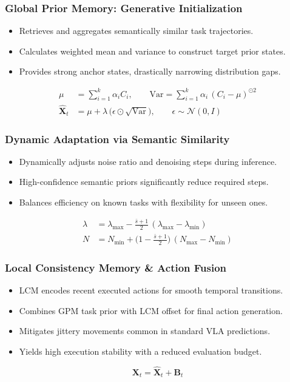 \documentclass{beamer}
\begin{document}
\begin{frame}
\frametitle{Global Prior Memory: Generative Initialization}
\begin{itemize}
\item Retrieves and aggregates semantically similar task trajectories.
\item Calculates weighted mean and variance to construct target prior states.
\item Provides strong anchor states, drastically narrowing distribution gaps.
\end{itemize}
\begin{align*}
\mu &= \sum_{i=1}^{k}\alpha_i C_i,\qquad \mathrm{Var}=\sum_{i=1}^{k}\alpha_i\, (C_i-\mu)^{\odot 2} \\
\mathbf{\hat{X}}_{t} &= \mu+\lambda\,\big(\epsilon\odot\sqrt{\mathrm{Var}}\big), \qquad \epsilon\sim\mathcal{N}(0,I)
\end{align*}
\end{frame}
\begin{frame}
\frametitle{Dynamic Adaptation via Semantic Similarity}
\begin{itemize}
\item Dynamically adjusts noise ratio and denoising steps during inference.
\item High-confidence semantic priors significantly reduce required steps.
\item Balances efficiency on known tasks with flexibility for unseen ones.
\end{itemize}
\begin{align*}
\lambda &= \lambda_{\max}-\tfrac{\bar s+1}{2}\,(\lambda_{\max}-\lambda_{\min}) \\
N &= N_{\min}+\big(1-\tfrac{\bar s+1}{2} \big)\,(N_{\max}-N_{\min})
\end{align*}
\end{frame}
\begin{frame}
\frametitle{Local Consistency Memory \& Action Fusion}
\begin{itemize}
\item LCM encodes recent executed actions for smooth temporal transitions.
\item Combines GPM task prior with LCM offset for final action generation.
\item Mitigates jittery movements common in standard VLA predictions.
\item Yields high execution stability with a reduced evaluation budget.
\end{itemize}
\begin{equation*}
\mathbf{X}_{t} = \mathbf{\hat{X}}_{t} + \mathbf{B}_{t}
\end{equation*}
\end{frame}
\end{document}
